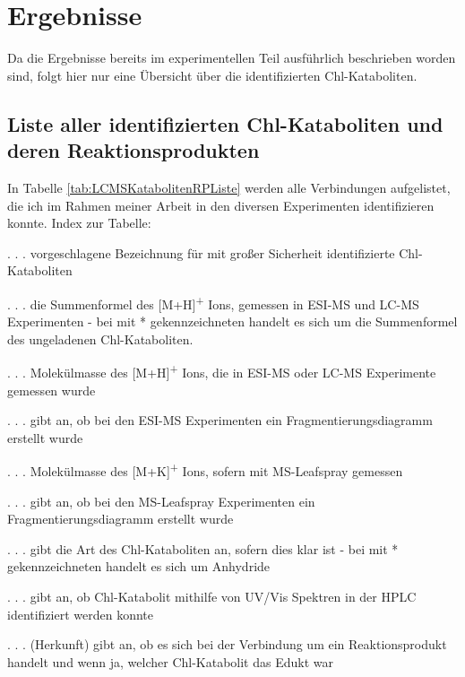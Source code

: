 \chapter{Ergebnisse}

Da die Ergebnisse bereits im experimentellen Teil ausführlich beschrieben worden sind, folgt hier nur eine Übersicht über die identifizierten Chl-Kataboliten.

\section{Liste aller identifizierten Chl-Kataboliten und deren Reaktionsprodukten}

In Tabelle \ref{tab:LCMSKatabolitenRPListe} werden alle Verbindungen aufgelistet, die ich im Rahmen meiner Arbeit in den diversen Experimenten identifizieren konnte. Index zur Tabelle:

\begin{description}[align=right,labelwidth=3cm]
  \item [Chl-Katabolit] . . . vorgeschlagene Bezeichnung für mit großer Sicherheit identifizierte Chl-Kataboliten
  \item [Summenformel] . . . die Summenformel des [M+H]\textsuperscript{+} Ions, gemessen in ESI-MS und LC-MS Experimenten - bei mit * gekennzeichneten handelt es sich um die Summenformel des ungeladenen Chl-Kataboliten.
  \item [M+H] . . . Molekülmasse des [M+H]\textsuperscript{+} Ions, die in ESI-MS oder LC-MS Experimente gemessen wurde
  \item [Frag. I] . . . gibt an, ob bei den ESI-MS Experimenten ein Fragmentierungsdiagramm erstellt wurde
  \item [MS-Leafspray] . . . Molekülmasse des [M+K]\textsuperscript{+} Ions, sofern mit MS-Leafspray gemessen
  \item [Frag. II] . . . gibt an, ob bei den MS-Leafspray Experimenten ein Fragmentierungsdiagramm erstellt wurde
  \item [Typ] . . . gibt die Art des Chl-Kataboliten an, sofern dies klar ist - bei mit * gekennzeichneten handelt es sich um Anhydride
  \item [HPLC] . . . gibt an, ob Chl-Katabolit mithilfe von UV/Vis Spektren in der HPLC identifiziert werden konnte
  \item [H.] . . . (Herkunft) gibt an, ob es sich bei der Verbindung um ein Reaktionsprodukt handelt und wenn ja, welcher Chl-Katabolit das Edukt war
\end{description} 


